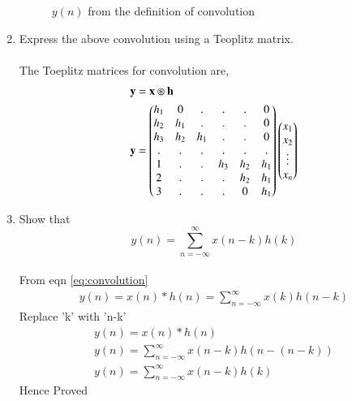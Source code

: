 \documentclass[journal,12pt,twocolumn]{IEEEtran}
\renewcommand\thesection{\arabic{section}}
\begin{document}
\begin{enumerate}[label=\thesection.\arabic*]
\begin{figure}[!ht]
\caption{$y(n)$ from the definition of convolution}
\label{fig:ynconv}
\end{figure}
\item Express the above convolution using a Teoplitz matrix.
\\
\solution 
\\The Toeplitz matrices for convolution are,
\begin{align}
 \mathbf{y} &= \mathbf{x} \circledast \mathbf{h}\\
 \mathbf{y} &= 
 \begin{pmatrix}
  h_1 & 0 & . & . & . & 0 \\
  h_2 & h_1 & . & . & . & 0 \\
  h_3 & h_2 & h_1 & . & . & 0 \\
  . & . & . & . & . & . \\
  1 & . & . & h_3 & h_2 & h_1 \\
  2 & . & . & . & h_2 & h_1 \\
  3 & . & . & . & 0 & h_1
 \end{pmatrix}
 \begin{pmatrix}
  x_1 \\ x_2 \\ \vdots \\ x_n
 \end{pmatrix}
\end{align}
\item Show that
\begin{equation}
y(n) =  \sum_{n=-\infty}^{\infty}x(n-k)h(k)
\end{equation}
\\
\solution
\solution
From eqn \eqref{eq:convolution}
\begin{align}
    y(n) = x(n)*h(n) = \sum_{n=-\infty}^{\infty}x(k)h(n-k)
\end{align}
Replace 'k' with 'n-k'
\begin{align}
y(n) = x(n)*h(n) 
\\
y(n)= \sum_{n=-\infty}^{\infty}x(n-k)h(n-(n-k))
\\
y(n)=\sum_{n=-\infty}^{\infty}x(n-k)h(k)
\end{align}
Hence Proved
\end{enumerate}
%
\end{document}
